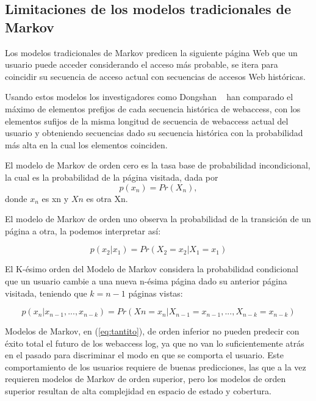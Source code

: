  
 
 \subsection{Limitaciones de los modelos tradicionales de Markov}
 
 
 Los modelos tradicionales de Markov predicen la siguiente página Web que un usuario puede acceder considerando el acceso más probable, se itera para  coincidir su secuencia de acceso actual con secuencias de accesos Web históricas.
 
 
 Usando estos modelos los investigadores como  Dongshan \etal~\cite{Dongshan2002} han comparado  el máximo de elementos  prefijos de cada secuencia histórica de webaccess,  con los elementos sufijos de la  misma longitud de secuencia de webaccess actual del usuario y obteniendo secuencias dado su secuencia histórica con la probabilidad más alta en la cual los elementos coinciden.
 
 El modelo de Markov de orden cero es la tasa base de probabilidad incondicional, la cual es la probabilidad de la página visitada, dada por
 \begin{equation}
p(x_n) = Pr(X_n),
 \end{equation}	
 donde $x_{n}$ es xn y $Xn$ es otra Xn.
 
 El modelo de Markov de orden uno observa la probabilidad de la transición de un página a otra, la podemos interpretar así:
 
 \begin{equation} 
	 p(x_{2} | x_1) = Pr(X_2 = x_2 | X_1 = x_1) 
 \end{equation}	
 
 El K-ésimo orden del Modelo de Markov considera la probabilidad condicional que un usuario cambie a una nueva  n-ésima página  dado su anterior página visitada, teniendo que $k = n -1$ páginas vistas:
 
 \begin{equation}\label{eq:tantito}
p( x_{n} | x_{n-1},..., x_{n-k} ) = Pr(X{n} = x_{n} | X_{n-1} = x_{n-1},..., X_{n-k} = x_{n-k}) 
 \end{equation}


 
 
 Modelos de Markov, en (\ref{eq:tantito}), de orden inferior no pueden predecir con éxito total el futuro de los webaccess log, ya que no van lo suficientemente atrás en el pasado para discriminar el modo en que se comporta el usuario. Este comportamiento de los usuarios requiere de buenas predicciones, las que a la vez requieren modelos de Markov de orden superior, pero los modelos de orden superior resultan de alta complejidad en espacio de estado y cobertura. 
 
